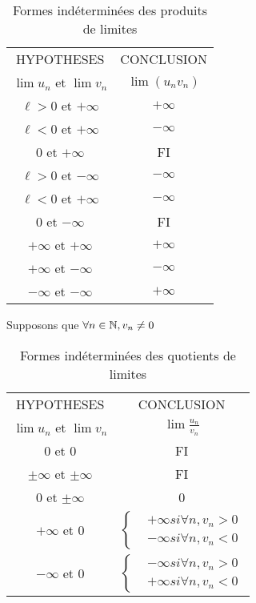 \begin{remarque}
    \begin{table}[!h]
        \centering
        \begin{tabular}{c c}
            HYPOTHESES & CONCLUSION \\
            $\lim u_n$ et $\lim v_n$ & $\lim (u_n v_n)$ \\
            $\ell > 0$ et $+\infty$ & $+\infty$ \\
            $\ell < 0$ et $+\infty$ & $-\infty$ \\
            $0$ et $+\infty$ & FI \\
            $\ell > 0$ et $-\infty$ & $-\infty$ \\
            $\ell < 0$ et $+\infty$ & $-\infty$ \\
            $0$ et $-\infty$ & FI \\
            $+\infty$ et $+\infty$ & $+\infty$ \\
            $+\infty$ et $-\infty$ & $-\infty$ \\
            $-\infty$ et $-\infty$ & $+\infty$
        \end{tabular}
        \caption{Formes indéterminées des produits de limites}
    \end{table}
\end{remarque}

\begin{remarque}
    Supposons que $\forall n \in \mathbb{N}, v_n \neq 0$
    \begin{table}[!h]
    \centering
    \begin{tabular}{c c}
        HYPOTHESES & CONCLUSION \\
        $\lim u_n$ et $\lim v_n$ & $\lim \frac{u_n}{v_n}$ \\
        $0$ et $0$ & FI \\
        $\pm \infty$ et $\pm \infty$ & FI \\
        $0$ et $\pm \infty$ & 0 \\
        $+\infty$ et $0$ & $\begin{cases} 
                             &+\infty si \forall n, v_n > 0 \\
                             &-\infty si \forall n, v_n < 0 
                            \end{cases}$ \\
        $-\infty$ et $0$ & $\begin{cases}
                                &-\infty si \forall n, v_n > 0 \\
                                &+\infty si \forall n, v_n < 0
                            \end{cases}$
    \end{tabular}
    \caption{Formes indéterminées des quotients de limites}
\end{table}
\end{remarque}


